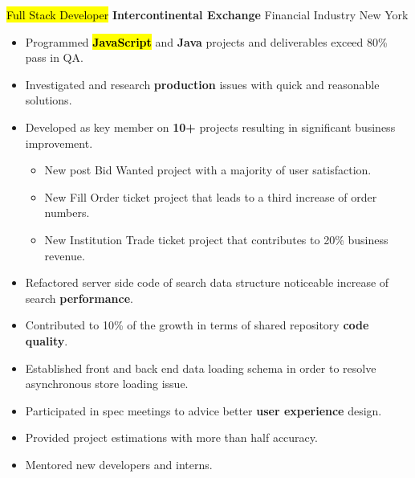 \documentclass[11pt,a4paper,sans]{moderncv}   %
\begin{document}
{\hl{Full Stack Developer}}
{\textbf{Intercontinental Exchange}}
{Financial Industry}
{New York}
{
	\begin{itemize}
	  \item{Programmed \hl{\textbf{JavaScript}} and \textbf{Java} projects and deliverables exceed 80\% pass in QA.}
	  \item{Investigated and research \textbf{production} issues with quick and reasonable solutions.}
    \item{Developed as key member on \textbf{10+} projects resulting in significant business improvement.}
    \begin{itemize}
      \item{New post Bid Wanted project with a majority of user satisfaction.}
      \item{New Fill Order ticket project that leads to a third increase of order numbers.}
      \item{New Institution Trade ticket project that contributes to 20\% business revenue.}
    \end{itemize}
    \item{Refactored server side code of search data structure noticeable increase of search \textbf{performance}.}
    \item{Contributed to 10\% of the growth in terms of shared repository \textbf{code quality}.}
    \item{Established front and back end data loading schema in order to resolve asynchronous store loading issue.}
    \item{Participated in spec meetings to advice better \textbf{user experience} design.}
    \item{Provided project estimations with more than half accuracy.}
    \item{Mentored new developers and interns.}
	\end{itemize}
}
\end{document}
